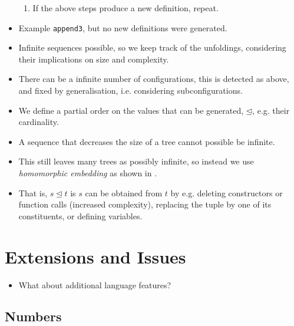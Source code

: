\begin{itemize}
\begin{enumerate}
\item If the above steps produce a new definition, repeat. 

\end{enumerate}

\item Example \texttt{append3}, but no new definitions were generated.

\item Infinite sequences possible, so we keep track of the unfoldings,
considering their implications on size and complexity.

\item There can be a infinite number of configurations, this is detected as
above, and fixed by generalisation, i.e. considering subconfigurations.

\item We define a partial order on the values that can be generated, $\unlhd$,
e.g. their cardinality.

\item A sequence that decreases the size of a tree cannot possible be infinite.

\item This still leaves many trees as possibly infinite, so instead we use
\emph{homomorphic embedding} as shown in .


\item That is, $s\unlhd t$ is $s$ can be obtained from $t$ by e.g. deleting
constructors or function calls (increased complexity), replacing the tuple by
one of its constituents, or defining variables.

\end{itemize}

\section{Extensions and Issues}

\begin{itemize}

\item What about additional language features?

\end{itemize}

\subsection{Numbers}

